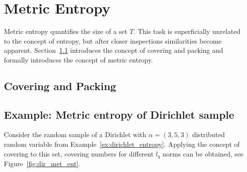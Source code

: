 \documentclass[12pt, twoside]{article}
\newcommand{\1}{\mathbb{1}}
\begin{document}
\FloatBarrier

\section{Metric Entropy}
Metric entropy quantifies the size of a set $T$. This task is superficially unrelated to the concept of entropy, but after closer inspections similarities become apparent.
Section~\ref{covering_packing} introduces the concept of covering and packing and formally introduces the concept of metric entropy.

\subsection{Covering and Packing}\label{covering_packing}


\subsection{Example: Metric entropy of Dirichlet sample}
Consider the random sample of a Dirichlet with $\alpha = (3, 5, 3)$ distributed random variable from Example~\ref{ex:dirichlet_entropy}. Applying the concept of covering to this set, covering numbers for different $l_q$ norms can be obtained, see Figure~\ref{fig:dir_met_ent}.
\end{document}
